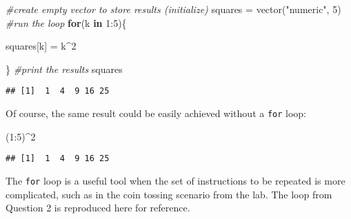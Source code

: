 \documentclass[
]{article}
\newenvironment{Shaded}{\begin{snugshade}}{\end{snugshade}}
\newcommand{\CommentTok}[1]{\textcolor[rgb]{0.56,0.35,0.01}{\textit{#1}}}
\newcommand{\ControlFlowTok}[1]{\textcolor[rgb]{0.13,0.29,0.53}{\textbf{#1}}}
\newcommand{\DecValTok}[1]{\textcolor[rgb]{0.00,0.00,0.81}{#1}}
\newcommand{\FunctionTok}[1]{\textcolor[rgb]{0.00,0.00,0.00}{#1}}
\newcommand{\NormalTok}[1]{#1}
\newcommand{\OtherTok}[1]{\textcolor[rgb]{0.56,0.35,0.01}{#1}}
\newcommand{\SpecialCharTok}[1]{\textcolor[rgb]{0.00,0.00,0.00}{#1}}
\newcommand{\StringTok}[1]{\textcolor[rgb]{0.31,0.60,0.02}{#1}}
\begin{document}
\begin{Shaded}
\begin{Highlighting}[]
\CommentTok{\#create empty vector to store results (initialize)}
\NormalTok{squares }\OtherTok{=} \FunctionTok{vector}\NormalTok{(}\StringTok{"numeric"}\NormalTok{, }\DecValTok{5}\NormalTok{)}
\CommentTok{\#run the loop}
\ControlFlowTok{for}\NormalTok{(k }\ControlFlowTok{in} \DecValTok{1}\SpecialCharTok{:}\DecValTok{5}\NormalTok{)\{}
  
\NormalTok{  squares[k] }\OtherTok{=}\NormalTok{ k}\SpecialCharTok{\^{}}\DecValTok{2}
  
\NormalTok{\}}
\CommentTok{\#print the results}
\NormalTok{squares}
\end{Highlighting}
\end{Shaded}

\begin{verbatim}
## [1]  1  4  9 16 25
\end{verbatim}

Of course, the same result could be easily achieved without a
\texttt{for} loop:

\begin{Shaded}
\begin{Highlighting}[]
\NormalTok{(}\DecValTok{1}\SpecialCharTok{:}\DecValTok{5}\NormalTok{)}\SpecialCharTok{\^{}}\DecValTok{2}
\end{Highlighting}
\end{Shaded}

\begin{verbatim}
## [1]  1  4  9 16 25
\end{verbatim}

The \texttt{for} loop is a useful tool when the set of instructions to
be repeated is more complicated, such as in the coin tossing scenario
from the lab. The loop from Question 2 is reproduced here for reference.
\end{document}
